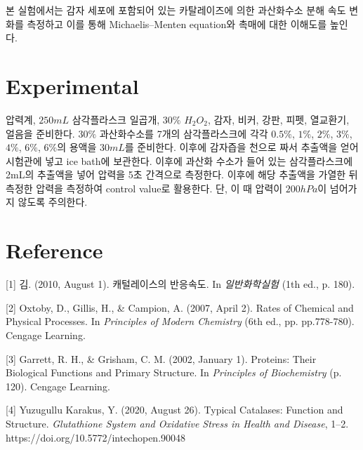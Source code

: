 \documentclass[%
 reprint,
 amsmath,amssymb,
 aps,
]{revtex4-2}
\begin{document}
본 실험에서는 감자 세포에 포함되어 있는 카탈레이즈에 의한 과산화수소 분해 속도 변화를 측정하고 이를 통해 Michaelis–Menten equation와 촉매에 대한 이해도를 높인다.

\section{\label{sec:level1}Experimental}
압력계, $250mL$ 삼각플라스크 일곱개, $30\%$ $H_{2}O_{2}$, 감자, 비커, 강판, 피펫, 열교환기, 얼음을 준비한다. $30\%$ 과산화수소를 7개의 삼각플라스크에 각각 $0.5\%$, $1\%$, $2\%$, $3\%$, $4\%$, $6\%$, $6\%$의 용액을 $30mL$를 준비한다. 이후에 감자즙을 천으로 짜서 추출액을 얻어 시험관에 넣고 ice bath에 보관한다. 이후에 과산화 수소가 들어 있는 삼각플라스크에 2mL의 추출액을 넣어 압력을 5초 간격으로 측정한다. 이후에 해당 추출액을 가열한 뒤 측정한 압력을 측정하여 control value로 활용한다. 단, 이 때 압력이 $200hPa$이 넘어가지 않도록 주의한다.

\section{\label{sec:level1}Reference}
[1] 김. (2010, August 1). 캐털레이스의 반응속도. In \textit{일반화학실험} (1th ed., p. 180).

[2] Oxtoby, D., Gillis, H., \& Campion, A. (2007, April 2). Rates of Chemical and Physical Processes. In \textit{Principles of Modern Chemistry} (6th ed., pp. pp.778-780). Cengage Learning.

[3] Garrett, R. H., \& Grisham, C. M. (2002, January 1). Proteins: Their Biological Functions and Primary Structure. In \textit{Principles of Biochemistry} (p. 120). Cengage Learning.

[4] Yuzugullu Karakus, Y. (2020, August 26). Typical Catalases: Function and Structure. \textit{Glutathione System and Oxidative Stress in Health and Disease}, 1–2. https://doi.org/10.5772/intechopen.90048
\end{document}

